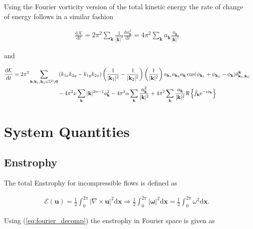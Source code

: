 \documentclass[9pt]{article}
\newcommand{\der}[2]{\frac{\mathrm{d}#1}{\mathrm{d}#2}}          	 %
\newcommand{\ii}{\mathrm{i}}      								  %
\newcommand{\e}{\mathrm{e}}      								  %
\newcommand{\curl}[1]{\nabla \times {#1}}								%
\newcommand{\bfu}{\mathbf{u}}											%
\newcommand{\bfx}{\mathbf{x}}								%
\newcommand{\bfk}{\mathbf{k}}								%
\newcommand{\bfkn}[1]{\mathbf{k}_{#1}}								%
\begin{document}
Using the Fourier vorticity version of the total kinetic energy the rate of change of energy follows in a similar fashion

\begin{align}
	\der{\mathcal{K}}{t} = 2\pi^2\sum_{\bfk}  \frac{1}{|\bfk|^2}\der{a_\bfk^2}{t} =4\pi^2\sum_{\bfk} a_\bfk \frac{\dot{a}_\bfk}{|\bfk|^2}
\end{align}

and 

\begin{align}
	\der{\mathcal{K}}{t} &= 2\pi^2	\sum_{\bfk, \mathbf{k}_1, \mathbf{k}_2\in \mathbb{Z}^2\setminus \mathbf{0}}\left(k_{1x}k_{2y} - k_{1y}k_{2x}\right) \left(\frac{1}{|\bfkn{1}|^2} - \frac{1}{|\bfkn{2}|^2}\right) \left( \frac{1}{|\bfk|^2}\right)a_{\bfkn{1}} a_{\bfkn{2}} a_{\bfk} \cos(\phi_{\bfkn{1}} + \phi_{\bfkn{2}} - \phi_{\bfk})\delta_{\bfkn{1}, \bfkn{2}}^{\bfk} \notag \\ & \qquad \qquad \qquad \qquad- 4\pi^2\nu \sum_{\bfk}|\bfk|^{2n - 1} a_{\bfk}^2 - 4\pi^2\alpha\sum_{\bfk} \frac{a_\bfk^2}{|\bfk|^2} + 4\pi^2\sum_{\bfk}\frac{a_\bfk}{|\bfk|^2}\Re\left\{\hat{f}_{\bfk} \e^{-\ii\phi_\bfk}\right\}
\end{align}

\section{System Quantities}

\subsection{Enstrophy}

The total Enstrophy for incompressible flows is defined as 

\begin{align}
	\mathcal{E}(\bfu) = \frac{1}{2}\int_{0}^{2\pi} |\curl{\bfu}|^2 \mathrm{d}\bfx \Rightarrow \frac{1}{2}\int_{0}^{2\pi} |\bm{\omega}|^2 \mathrm{d}\bfx = \frac{1}{2}\int_{0}^{2\pi} \omega^2 \mathrm{d}\bfx .
	\label{eq:enstrophy_def}
\end{align}

Using (\ref{eq:fourier_decomp}) the enstrophy in Fourier space is given as 
\end{document}
